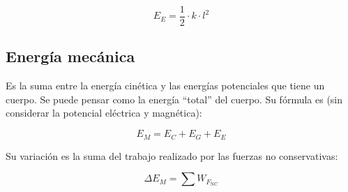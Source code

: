 $$E_E =\dfrac{1}{2} \cdot k \cdot l^2$$


\subsection*{Energía mecánica}

Es la suma entre la energía cinética y las energías potenciales que tiene un cuerpo. Se puede pensar como la energía ``total'' del cuerpo. Su fórmula es (sin considerar la potencial eléctrica y magnética):

$$E_M = E_C + E_G + E_E$$

Su variación es la suma del trabajo realizado por las fuerzas no conservativas:

$$\Delta E_M = \sum W_{F_{\text{NC}}}$$


